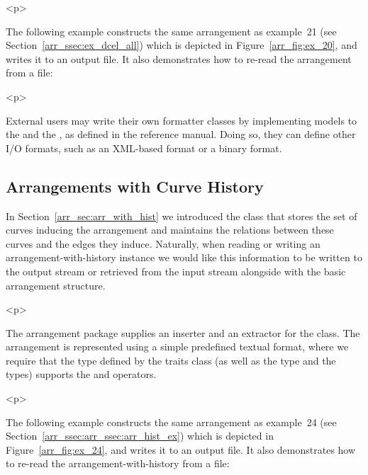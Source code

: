 \begin{ccAdvanced}
\begin{ccHtmlOnly}<p>\end{ccHtmlOnly}
The following example constructs the same arrangement as example~21
(see Section~\ref{arr_ssec:ex_dcel_all}) which is depicted in
Figure~\ref{arr_fig:ex_20}, and writes it to an output file. It also
demonstrates how to re-read the arrangement from a file:


\begin{ccHtmlOnly}<p>\end{ccHtmlOnly}
External users may write their own formatter classes by implementing
models to the  and the
, as defined in the reference manual.
Doing so, they can define other I/O formats, such as an XML-based
format or a binary format.
\end{ccAdvanced}

\subsection{Arrangements with Curve History}
\label{arr_ssec:arr_io_hist}
%
In Section~\ref{arr_sec:arr_with_hist} we introduced the
 class that stores the
set of curves inducing the arrangement and maintains the relations between
these curves and the edges they induce. Naturally, when reading or writing an
arrangement-with-history instance we would like this information to be
written to the output stream or retrieved from the input stream alongside
with the basic arrangement structure.

\begin{ccHtmlOnly}<p>\end{ccHtmlOnly}
The arrangement package supplies an inserter and an extractor for the
 class. The arrangement is
represented using a simple predefined textual format, where we require that
the  type defined by the traits class (as well as the
 type and the  types) supports
the \ccc{<<} and\ccc{>>} operators.

\begin{ccHtmlOnly}<p>\end{ccHtmlOnly}
The following example constructs the same arrangement as example~24
(see Section~\ref{arr_ssec:arr_ssec:arr_hist_ex}) which is depicted in
Figure~\ref{arr_fig:ex_24}, and writes it to an output file. It also
demonstrates how to re-read the arrangement-with-history from a file:

